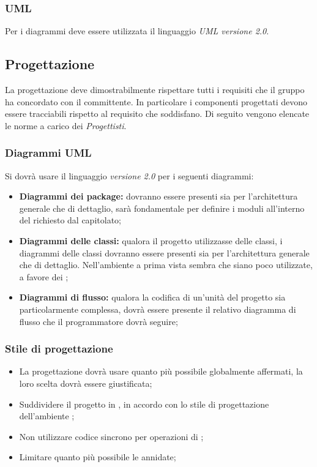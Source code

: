 \subsubsection{UML}

Per i diagrammi deve essere utilizzata il linguaggio \emph{UML versione 2.0}.


\subsection{Progettazione}
La progettazione deve dimostrabilmente rispettare tutti i requisiti che il gruppo ha concordato con il committente. In particolare i componenti progettati devono essere tracciabili rispetto al requisito che soddisfano.
Di seguito vengono elencate le norme a carico dei \emph{Progettisti}.

    \subsubsection{Diagrammi UML}
    Si dovrà usare il linguaggio  \emph{versione 2.0} per i seguenti diagrammi:
\begin{itemize}
 \item \textbf{Diagrammi dei package:} dovranno essere presenti sia per l'architettura generale che di dettaglio, sarà fondamentale per definire i moduli all'interno del   richiesto dal capitolato;
 \item \textbf{Diagrammi delle classi:} qualora il progetto utilizzasse delle classi, i diagrammi delle classi dovranno essere presenti sia per l'architettura generale che di dettaglio. Nell'ambiente  a prima vista sembra che siano poco utilizzate, a favore dei ;
 \item \textbf{Diagrammi di flusso:} qualora la codifica di un'unità del progetto sia particolarmente complessa, dovrà essere presente il relativo diagramma di flusso che il programmatore dovrà seguire;
\end{itemize}

    \subsubsection{Stile di progettazione}
    \begin{itemize}
        \item La progettazione dovrà usare quanto più possibile  globalmente affermati, la loro scelta dovrà essere giustificata;
        \item Suddividere il progetto in , in accordo con lo stile di progettazione dell'ambiente ;
        \item Non utilizzare codice sincrono per operazioni di ;
        \item Limitare quanto più possibile le  annidate;
    \end{itemize}



